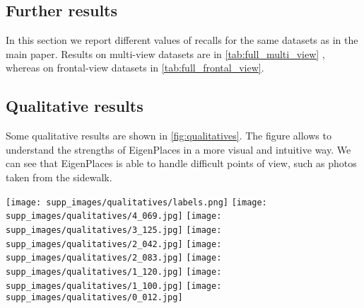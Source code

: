 \documentclass[10pt,twocolumn,letterpaper]{article}
\begin{document}
 \subsection{Further results}
In this section we report different values of recalls for the same datasets as in the main paper.
Results on multi-view datasets are in \cref{tab:full_multi_view} , whereas on frontal-view datasets in \cref{tab:full_frontal_view}.

\subsection{Qualitative results}
Some qualitative results are shown in \cref{fig:qualitatives}.
The figure allows to understand the strengths of EigenPlaces in a more visual and intuitive way. We can see that EigenPlaces is able to handle difficult points of view, such as photos taken from the sidewalk.

\begin{figure*}
    \begin{center}
    \texttt{[image: supp\_images/qualitatives/labels.png]}
    \texttt{[image: supp\_images/qualitatives/4\_069.jpg]}
    \texttt{[image: supp\_images/qualitatives/3\_125.jpg]}
    \texttt{[image: supp\_images/qualitatives/2\_042.jpg]}
    \texttt{[image: supp\_images/qualitatives/2\_083.jpg]}
    \texttt{[image: supp\_images/qualitatives/1\_120.jpg]}
    \texttt{[image: supp\_images/qualitatives/1\_100.jpg]}
    \texttt{[image: supp\_images/qualitatives/0\_012.jpg]}
    \end{center}
    \caption{\textbf{Qualitative results with most popular methods.} Each column represents a query (top row) and the first predicted image from the database. We can see that EigenPlaces is able to better handle challenging viewpoints than previous methods.}
    \label{fig:qualitatives}
\end{figure*}


 
\end{document}
